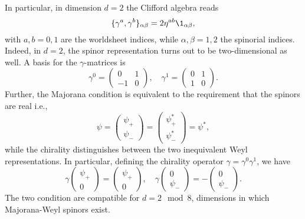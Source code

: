 In particular, in dimension $d=2$ the Clifford algebra reads
\begin{equation}
    \{ \gamma^a, \gamma^b \}_{\alpha\beta} = 2 \eta^{ab} \1_{\alpha\beta},
\end{equation}
with $a,b = 0, 1$ are the worldsheet indices, while $\alpha,\beta = 1,2$ the spinorial indices. Indeed, in $d=2$, the spinor representation turns out to be two-dimensional as well. A basis for the $\gamma$-matrices is
\begin{equation}
    \gamma^0 = \begin{pmatrix}
        0 & 1 \\
        -1 & 0
    \end{pmatrix}, \quad \gamma^1 = \begin{pmatrix}
        0 & 1 \\
        1 & 0
    \end{pmatrix}.
\end{equation}
Further, the Majorana condition is equivalent to the requirement that the spinors are real i.e.,
\begin{equation}
    \psi = \begin{pmatrix}
        \psi_+ \\ \psi_-
    \end{pmatrix} = \begin{pmatrix}
        \psi^*_+ \\ \psi^*_-
    \end{pmatrix} = \psi^*,
\end{equation}
while the chirality distinguishes between the two inequivalent Weyl representations. In particular, defining the chirality operator $\gamma = \gamma^0 \gamma^1$, we have
\begin{equation}
    \gamma \begin{pmatrix}
        \psi_+ \\ 0
    \end{pmatrix} = \begin{pmatrix}
        \psi_+ \\ 0
    \end{pmatrix}, \quad \gamma \begin{pmatrix}
        0 \\ \psi_-
    \end{pmatrix} = - \begin{pmatrix}
        0 \\ \psi_-
    \end{pmatrix}.
\end{equation}
The two condition are compatible for $d = 2 \mod 8$, dimensions in which Majorana-Weyl spinors exist.

